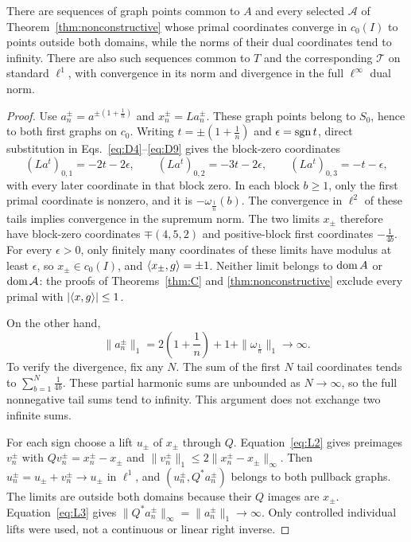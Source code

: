 \begin{proposition}
\label{prop:boundary-sequences}
There are sequences of graph points common to $A$ and every selected
$\mathcal A$ of Theorem~\ref{thm:nonconstructive} whose primal
coordinates converge in $c_0(I)$ to points outside both domains,
while the norms of their dual coordinates tend to infinity.
There are also such sequences common to $T$ and the corresponding
$\mathcal T$ on standard $\ell^1$, with convergence in its norm
and divergence in the full $\ell^\infty$ dual norm.
\end{proposition}
\begin{proof}
Use $a_n^\pm=a^{\pm(1+\frac{1}{n})}$ and $x_n^\pm=La_n^\pm$. These graph points
belong to $S_0$, hence to both first graphs on $c_0$.
Writing $t=\pm(1+\frac{1}{n})$ and $\epsilon=\operatorname{sgn} t$, direct substitution in
Eqs.~\eqref{eq:D4}--\eqref{eq:D9} gives the block-zero coordinates
\[
(La^t)_{0,1}=-2t-2\epsilon,\qquad
(La^t)_{0,2}=-3t-2\epsilon,\qquad
(La^t)_{0,3}=-t-\epsilon,
\]
with every later coordinate in that block zero. In each block $b\ge1$,
only the first primal coordinate is nonzero, and it is
$-\omega_{\frac{1}{n}}(b)$. The convergence in $\ell^2$ of these tails implies
convergence in the supremum norm. The two limits $x_\pm$ therefore have
block-zero coordinates $\mp(4,5,2)$ and positive-block first coordinates
$-\frac{1}{4b}$. For every $\epsilon>0$, only finitely many coordinates of
these limits have modulus at least $\epsilon$, so $x_\pm\in c_0(I)$, and
$\langle x_\pm,g\rangle=\pm1$. Neither limit belongs to $\operatorname{dom} A$ or
$\operatorname{dom}\mathcal A$: the proofs of Theorems~\ref{thm:C} and
\ref{thm:nonconstructive} exclude every primal with
$|\langle x,g\rangle|\le1$.

On the other hand,
\[
\|a_n^\pm\|_1=2(1+\frac{1}{n})+1+\|\omega_{\frac{1}{n}}\|_1\longrightarrow\infty.
\]
To verify the divergence, fix any $N$. The sum of the first $N$ tail
coordinates tends to $\sum_{b=1}^N\frac{1}{4b}$. These partial harmonic sums
are unbounded as $N\to\infty$, so the full nonnegative tail sums tend
to infinity. This argument does not exchange two infinite sums.

For each sign choose a lift $u_\pm$ of $x_\pm$ through $Q$.
Equation~\eqref{eq:L2} gives preimages $v_n^\pm$ with
$Qv_n^\pm=x_n^\pm-x_\pm$ and
$\|v_n^\pm\|_1\le2\|x_n^\pm-x_\pm\|_\infty$.
Then $u_n^\pm=u_\pm+v_n^\pm\to u_\pm$ in $\ell^1$, and
$(u_n^\pm,Q^*a_n^\pm)$ belongs to both pullback graphs. The limits
are outside both domains because their $Q$ images are $x_\pm$.
Equation~\eqref{eq:L3} gives
$\|Q^*a_n^\pm\|_\infty=\|a_n^\pm\|_1\to\infty$.
Only controlled individual lifts were used, not a continuous or linear
right inverse.
\end{proof}

